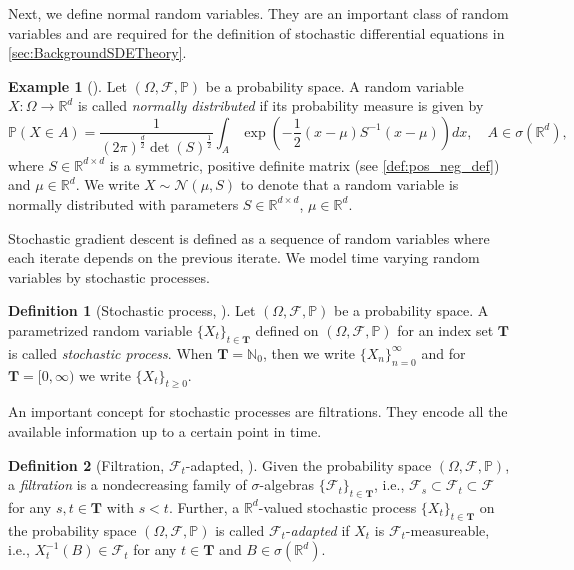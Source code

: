 \documentclass[12pt]{article}
\theoremstyle{definition}
\newtheorem{example}[example]{Example}
\newtheorem{definition}[definition]{Definition}
\numberwithin{equation}{section}
\newcommand{\N}{\mathbb{N}}
\newcommand{\R}{\mathbb{R}}
\newcommand{\BP}{\mathbb{P}}
\newcommand{\CF}{\mathcal{F}}
\newcommand{\CN}{\mathcal{N}}
\begin{document}
 Next, we define normal random variables. They are an important class of random variables and are required for the definition of stochastic differential equations in \autoref{sec:BackgroundSDETheory}.
 \begin{example}[]
  Let $(\Omega, \CF, \BP)$ be a probability space. A random variable $X : \Omega \rightarrow \R^d$ is called \emph{normally distributed} if its probability measure is given by
  \begin{equation*}
    \BP(X \in A) = \frac{1}{(2 \pi)^\frac{d}{2} \det(S)^\frac{1}{2}} \int_A \exp\left(-\frac{1}{2}(x-\mu)S^{-1}(x-\mu)\right)dx, \quad A \in \sigma(\R^d),
  \end{equation*}
  where $S \in \R^{d \times d}$ is a symmetric, positive definite matrix (see \autoref{def:pos_neg_def}) and $\mu \in \R^d$. We write $X \sim \CN(\mu, S)$ to denote that a random variable is normally distributed with parameters $S \in \R^{d \times d}$, $\mu \in \R^d$.
 \end{example}
 Stochastic gradient descent is defined as a sequence of random variables where each iterate depends on the previous iterate. We model time varying random variables by stochastic processes.
 \begin{definition}[Stochastic process, ]
  Let $(\Omega, \CF, \BP)$ be a probability space. A parametrized random variable $\{X_t\}_{t \in \bm{T}}$ defined on $(\Omega, \CF, \BP)$ for an index set $\bm{T}$ is called \emph{stochastic process}. When $\bm{T} = \N_0$, then we write $\{X_n\}_{n=0}^\infty$ and for $\bm{T} = [0,\infty)$ we write $\{X_t\}_{t \geq 0}$.
 \end{definition}
 An important concept for stochastic processes are filtrations. They encode all the available information up to a certain point in time.
 \begin{definition}[Filtration, $\CF_t$-adapted, ]
   Given the probability space $(\Omega, \CF, \BP)$, a \emph{filtration} is a nondecreasing family of $\sigma$-algebras $\{\CF_t\}_{t\in \mathbf{T}}$, i.e., $\CF_s \subset \CF_t \subset \CF$ for any $s,t \in \mathbf{T}$ with $s < t$. Further, a $\R^d$-valued stochastic process $\{X_t\}_{t \in \mathbf{T}}$ on the probability space  $(\Omega, \CF, \BP)$ is called $\CF_t$-\emph{adapted} if $X_t$ is $\CF_t$-measureable, i.e., $X_t^{-1}(B) \in \CF_t$ for any $t \in \mathbf{T}$ and $B \in \sigma(\R^d)$.
 \end{definition}
\end{document}
